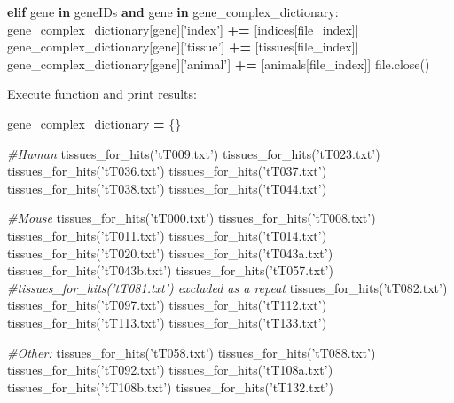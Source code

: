 \documentclass[
]{article}
\newenvironment{Shaded}{\begin{snugshade}}{\end{snugshade}}
\newcommand{\BuiltInTok}[1]{#1}
\newcommand{\CommentTok}[1]{\textcolor[rgb]{0.56,0.35,0.01}{\textit{#1}}}
\newcommand{\ControlFlowTok}[1]{\textcolor[rgb]{0.13,0.29,0.53}{\textbf{#1}}}
\newcommand{\KeywordTok}[1]{\textcolor[rgb]{0.13,0.29,0.53}{\textbf{#1}}}
\newcommand{\NormalTok}[1]{#1}
\newcommand{\OperatorTok}[1]{\textcolor[rgb]{0.81,0.36,0.00}{\textbf{#1}}}
\newcommand{\StringTok}[1]{\textcolor[rgb]{0.31,0.60,0.02}{#1}}
\begin{document}
\begin{Shaded}
\begin{Highlighting}[]
    \ControlFlowTok{elif}\NormalTok{ gene }\KeywordTok{in}\NormalTok{ geneIDs }\KeywordTok{and}\NormalTok{ gene }\KeywordTok{in}\NormalTok{ gene_complex_dictionary:}
\NormalTok{      gene_complex_dictionary[gene][}\StringTok{'index'}\NormalTok{] }\OperatorTok{+=}\NormalTok{ [indices[file_index]]}
\NormalTok{      gene_complex_dictionary[gene][}\StringTok{'tissue'}\NormalTok{] }\OperatorTok{+=}\NormalTok{ [tissues[file_index]]}
\NormalTok{      gene_complex_dictionary[gene][}\StringTok{'animal'}\NormalTok{] }\OperatorTok{+=}\NormalTok{ [animals[file_index]]}
  \BuiltInTok{file}\NormalTok{.close()}
\end{Highlighting}
\end{Shaded}

Execute function and print results:

\begin{Shaded}
\begin{Highlighting}[]
\NormalTok{gene_complex_dictionary }\OperatorTok{=}\NormalTok{ \{\}}

\CommentTok{#Human}
\NormalTok{tissues_for_hits(}\StringTok{'tT009.txt'}\NormalTok{)}
\NormalTok{tissues_for_hits(}\StringTok{'tT023.txt'}\NormalTok{)}
\NormalTok{tissues_for_hits(}\StringTok{'tT036.txt'}\NormalTok{)}
\NormalTok{tissues_for_hits(}\StringTok{'tT037.txt'}\NormalTok{)}
\NormalTok{tissues_for_hits(}\StringTok{'tT038.txt'}\NormalTok{)}
\NormalTok{tissues_for_hits(}\StringTok{'tT044.txt'}\NormalTok{)}

\CommentTok{#Mouse}
\NormalTok{tissues_for_hits(}\StringTok{'tT000.txt'}\NormalTok{)}
\NormalTok{tissues_for_hits(}\StringTok{'tT008.txt'}\NormalTok{)}
\NormalTok{tissues_for_hits(}\StringTok{'tT011.txt'}\NormalTok{)}
\NormalTok{tissues_for_hits(}\StringTok{'tT014.txt'}\NormalTok{)}
\NormalTok{tissues_for_hits(}\StringTok{'tT020.txt'}\NormalTok{)}
\NormalTok{tissues_for_hits(}\StringTok{'tT043a.txt'}\NormalTok{)}
\NormalTok{tissues_for_hits(}\StringTok{'tT043b.txt'}\NormalTok{)}
\NormalTok{tissues_for_hits(}\StringTok{'tT057.txt'}\NormalTok{)}
\CommentTok{#tissues_for_hits('tT081.txt') excluded as a repeat}
\NormalTok{tissues_for_hits(}\StringTok{'tT082.txt'}\NormalTok{)}
\NormalTok{tissues_for_hits(}\StringTok{'tT097.txt'}\NormalTok{)}
\NormalTok{tissues_for_hits(}\StringTok{'tT112.txt'}\NormalTok{)}
\NormalTok{tissues_for_hits(}\StringTok{'tT113.txt'}\NormalTok{)}
\NormalTok{tissues_for_hits(}\StringTok{'tT133.txt'}\NormalTok{)}

\CommentTok{#Other:}
\NormalTok{tissues_for_hits(}\StringTok{'tT058.txt'}\NormalTok{)}
\NormalTok{tissues_for_hits(}\StringTok{'tT088.txt'}\NormalTok{)}
\NormalTok{tissues_for_hits(}\StringTok{'tT092.txt'}\NormalTok{)}
\NormalTok{tissues_for_hits(}\StringTok{'tT108a.txt'}\NormalTok{)}
\NormalTok{tissues_for_hits(}\StringTok{'tT108b.txt'}\NormalTok{)}
\NormalTok{tissues_for_hits(}\StringTok{'tT132.txt'}\NormalTok{)}
\end{Highlighting}
\end{Shaded}
\end{document}
